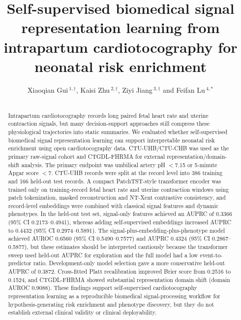 \documentclass[utf8]{FrontiersinHarvard}
\def\firstAuthorLast{Gui {et~al.}}
\def\Authors{Xiaoqian Gui\,$^{1,\dagger}$, Kaisi Zhu\,$^{2,\dagger}$, Ziyi Jiang\,$^{3,\dagger}$ and Feifan Lu\,$^{4,*}$}
\begin{document}
        \onecolumn

        \title[Self-supervised CTG signal representation]{Self-supervised biomedical signal representation learning from intrapartum cardiotocography for neonatal risk enrichment}

        \author[\firstAuthorLast ]{\Authors}
        \address{}
        \correspondance{}


        \maketitle

        \begin{abstract}
        \section{}
        Intrapartum cardiotocography records long paired fetal heart rate and uterine contraction signals, but many decision-support approaches still compress these physiological trajectories into static summaries. We evaluated whether self-supervised biomedical signal representation learning can support interpretable neonatal risk enrichment using open cardiotocography data. CTU-UHB/CTU-CHB was used as the primary raw-signal cohort and CTGDL-FHRMA for external representation/domain-shift analysis. The primary endpoint was umbilical artery pH $<$7.15 or 5-minute Apgar score $<$7. CTU-UHB records were split at the record level into 386 training and 166 held-out test records. A compact PatchTST-style transformer encoder was trained only on training-record fetal heart rate and uterine contraction windows using patch tokenization, masked reconstruction and NT-Xent contrastive consistency, and record-level embeddings were combined with classical signal features and dynamic phenotypes. In the held-out test set, signal-only features achieved an AUPRC of 0.3366 (95\% CI 0.2173--0.4941), whereas adding self-supervised embeddings increased AUPRC to 0.4432 (95\% CI 0.2974--0.5891). The signal-plus-embedding-plus-phenotype model achieved AUROC 0.6560 (95\% CI 0.5490--0.7577) and AUPRC 0.4324 (95\% CI 0.2867--0.5877), but these estimates should be interpreted cautiously because the transformer sweep used held-out AUPRC for exploration and the full model had a low event-to-predictor ratio. Development-only model selection gave a more conservative held-out AUPRC of 0.3872. Cross-fitted Platt recalibration improved Brier score from 0.2516 to 0.1524, and CTGDL-FHRMA showed substantial representation domain shift (domain AUROC 0.9088). These findings support self-supervised cardiotocography representation learning as a reproducible biomedical signal-processing workflow for hypothesis-generating risk enrichment and phenotype discovery, but they do not establish external clinical validity or clinical deployability.


\end{abstract}
\end{document}
